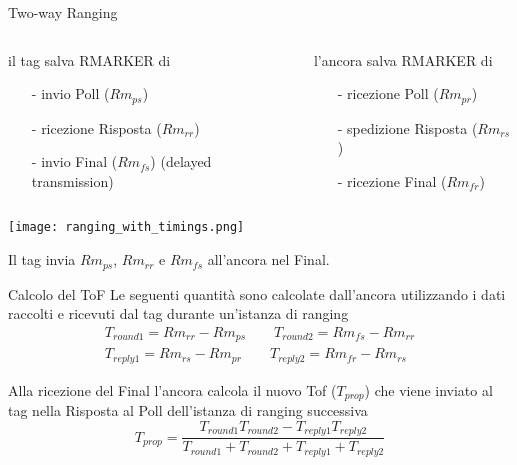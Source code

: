 \begin{frame}{Two-way Ranging}
  \begin{columns}[T]
    \begin{column}{0.5\textwidth}
      il \alert{tag} salva RMARKER di
      \begin{itemize}
      \item[-] invio Poll ($Rm_{ps}$)
      \item[-] ricezione Risposta ($Rm_{rr}$)
      \item[-] invio Final ($Rm_{fs}$) (delayed transmission)
      \end{itemize}
    \end{column}
    \begin{column}{0.5\textwidth}
      l'\alert{ancora} salva RMARKER di
      \begin{itemize}
      \item[-] ricezione Poll ($Rm_{pr}$)
      \item[-] spedizione Risposta ($Rm_{rs}$)
      \item[-] ricezione Final ($Rm_{fr}$)
      \end{itemize}
    \end{column}
  \end{columns}
  \begin{center}
    \texttt{[image: ranging\_with\_timings.png]}
  \end{center}
  Il tag invia $Rm_{ps}$, $Rm_{rr}$ e $Rm_{fs}$ all'ancora nel Final.
\end{frame}

\begin{frame}{Calcolo del ToF}
  Le seguenti quantità sono \alert{calcolate} dall'\alert{ancora} utilizzando i dati raccolti e
  ricevuti dal tag durante un'istanza di ranging
  \[
  \begin{split}
    T_{round1} = Rm_{rr} - Rm_{ps} \quad \quad T_{round2} = Rm_{fs} - Rm_{rr}\\
    T_{reply1} = Rm_{rs} - Rm_{pr} \quad \quad T_{reply2} = Rm_{fr} - Rm_{rs}
  \end{split}
  \]

  Alla ricezione del Final l'ancora calcola il nuovo Tof ($T_{prop}$) che viene inviato al tag nella Risposta al Poll dell'istanza di ranging \alert{successiva}
  \[
  T_{prop} = \frac{T_{round1} T_{round2} - T_{reply1} T_{reply2}}{T_{round1} + T_{round2} + T_{reply1} + T_{reply2}}
  \]
\end{frame}

